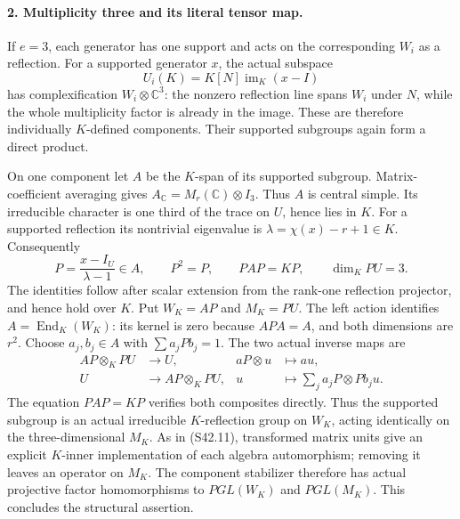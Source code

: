 \paragraph{2. Multiplicity three and its literal tensor map.}
If \(e=3\), each generator has one support and acts on the
corresponding \(W_i\) as a reflection. For a supported
generator \(x\), the actual subspace
\[
                 U_i(K)=K[N]\operatorname{im}_K(x-I)        \tag{S44.7}
\]
has complexification \(W_i\otimes\mathbb C^3\):
the nonzero reflection line spans \(W_i\) under \(N\),
while the whole multiplicity factor is already in the image.
These are therefore individually \(K\)-defined components.
Their supported subgroups again form a direct product.

On one component let \(A\) be the \(K\)-span of its
supported subgroup. Matrix-coefficient averaging gives
\(A_{\mathbb C}=M_r(\mathbb C)\otimes I_3\). Thus \(A\)
is central simple. Its irreducible character is one third
of the trace on \(U\), hence lies in \(K\). For a
supported reflection its nontrivial eigenvalue is
\(\lambda=\chi(x)-r+1\in K\). Consequently
\[
 P=\frac{x-I_U}{\lambda-1}\in A,\qquad P^2=P,\qquad
 PAP=KP,\qquad \dim_K PU=3.
 \tag{S44.8}
\]
The identities follow after scalar extension from the
rank-one reflection projector, and hence hold over \(K\).
Put \(W_K=AP\) and \(M_K=PU\). The left action identifies
\(A=\operatorname{End}_K(W_K)\): its kernel is zero because
\(APA=A\), and both dimensions are \(r^2\).
Choose \(a_j,b_j\in A\) with \(\sum a_jPb_j=1\).
The two actual inverse maps are
\[
 \begin{aligned}
 AP\otimes_K PU&\longrightarrow U,&aP\otimes u&\longmapsto au,\\
 U&\longrightarrow AP\otimes_K PU,&
 u&\longmapsto\sum_j a_jP\otimes Pb_j u.
 \end{aligned}                                             \tag{S44.9}
\]
The equation \(PAP=KP\) verifies both composites directly.
Thus the supported subgroup is an actual irreducible
\(K\)-reflection group on \(W_K\), acting identically on
the three-dimensional \(M_K\). As in (S42.11), transformed
matrix units give an explicit \(K\)-inner implementation
of each algebra automorphism; removing it leaves an operator
on \(M_K\). The component stabilizer therefore has actual
projective factor homomorphisms to \(PGL(W_K)\) and
\(PGL(M_K)\). This concludes the structural assertion.

